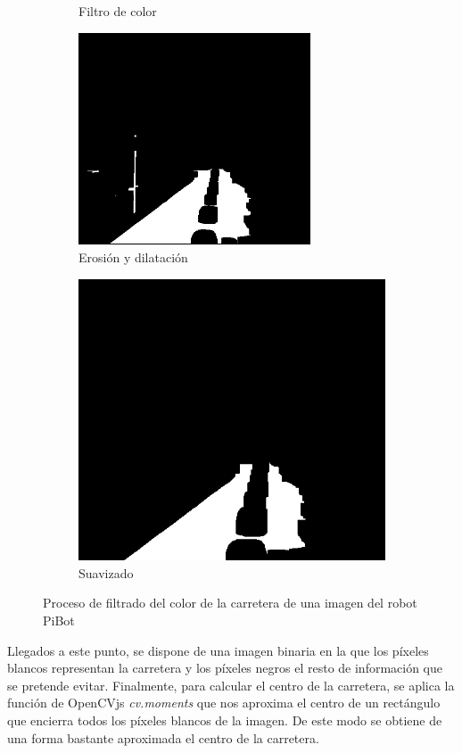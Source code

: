\documentclass{report}
\begin{document}
\begin{figure}[h]
\begin{subfigure}{.5\textwidth}
  \caption{Filtro de color}
  \label{fig:sub-second}
\end{subfigure}
\begin{subfigure}{.5\textwidth}
  \centering
  \includegraphics[width=.7\linewidth]{images/cap4/erosion-dilatacion.png}  
  \caption{Erosión y dilatación}
  \label{fig:sub-third}
\end{subfigure}
\begin{subfigure}{.5\textwidth}
  \centering
  \includegraphics[width=.7\linewidth]{images/cap4/erode.png}  
  \caption{Suavizado}
  \label{fig:sub-fourth}
\end{subfigure}
\caption{Proceso de filtrado del color de la carretera de una imagen del robot PiBot}
\label{fig:fig}
\end{figure}

Llegados a este punto, se dispone de una imagen binaria en la que los píxeles blancos representan la carretera y los píxeles negros el resto de información que se pretende evitar. Finalmente, para calcular el centro de la carretera, se aplica la función de OpenCVjs \textit{cv.moments} que nos aproxima el centro de un rectángulo que encierra todos los píxeles blancos de la imagen. De este modo se obtiene de una forma bastante aproximada el centro de la carretera.
\end{document}
